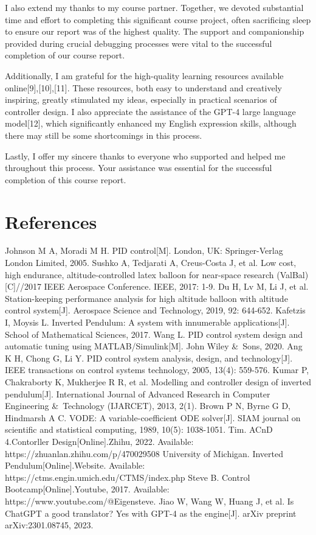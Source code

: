 \documentclass[journal,twoside,web]{ieeecolor}
\begin{document}
I also extend my thanks to my course partner. Together, we devoted substantial time and effort to completing this significant course project, often sacrificing sleep to ensure our report was of the highest quality. The support and companionship provided during crucial debugging processes were vital to the successful completion of our course report.

Additionally, I am grateful for the high-quality learning resources available online[9],[10],[11]. These resources, both easy to understand and creatively inspiring, greatly stimulated my ideas, especially in practical scenarios of controller design. I also appreciate the assistance of the GPT-4 large language model[12], which significantly enhanced my English expression skills, although there may still be some shortcomings in this process.

Lastly, I offer my sincere thanks to everyone who supported and helped me throughout this process. Your assistance was essential for the successful completion of this course report.

\section*{References}

\begin{thebibliography}{00}

Johnson M A, Moradi M H. PID control[M]. London, UK: Springer-Verlag London Limited, 2005.
Sushko A, Tedjarati A, Creus-Costa J, et al. Low cost, high endurance, altitude-controlled latex balloon for near-space research (ValBal)[C]//2017 IEEE Aerospace Conference. IEEE, 2017: 1-9.
 Du H, Lv M, Li J, et al. Station-keeping performance analysis for high altitude balloon with altitude control system[J]. Aerospace Science and Technology, 2019, 92: 644-652.
Kafetzis I, Moysis L. Inverted Pendulum: A system with innumerable applications[J]. School of Mathematical Sciences, 2017.
Wang L. PID control system design and automatic tuning using MATLAB/Simulink[M]. John Wiley \&\ Sons, 2020.
Ang K H, Chong G, Li Y. PID control system analysis, design, and technology[J]. IEEE transactions on control systems technology, 2005, 13(4): 559-576.
Kumar P, Chakraborty K, Mukherjee R R, et al. Modelling and controller design of inverted pendulum[J]. International Journal of Advanced Research in Computer Engineering \&\ Technology (IJARCET), 2013, 2(1).
Brown P N, Byrne G D, Hindmarsh A C. VODE: A variable-coefficient ODE solver[J]. SIAM journal on scientific and statistical computing, 1989, 10(5): 1038-1051.
Tim. ACnD 4.Contorller Design[Online].Zhihu, 2022. Available: https://zhuanlan.zhihu.com/p/470029508
University of Michigan. Inverted Pendulum[Online].Website. Available: https://ctms.engin.umich.edu/CTMS/index.php
Steve B. Control Bootcamp[Online].Youtube, 2017. Available: https://www.youtube.com/@Eigensteve.
Jiao W, Wang W, Huang J, et al. Is ChatGPT a good translator? Yes with GPT-4 as the engine[J]. arXiv preprint arXiv:2301.08745, 2023.
\end{thebibliography}
\end{document}
